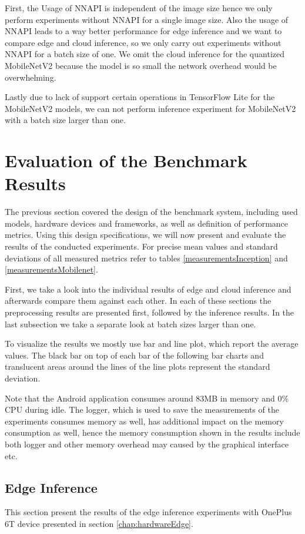 First, the Usage of NNAPI is independent of the image size hence we only perform experiments without NNAPI for a single image size. Also the usage of NNAPI leads to a way better performance for edge inference and we want to compare edge and cloud inference, so we only carry out experiments without NNAPI for a batch size of one.
We omit the cloud inference for the quantized MobileNetV2 because the model is so small the network overhead would be overwhelming.%

Lastly due to lack of support certain operations in TensorFlow Lite for the MobileNetV2 models, we can not perform inference experiment for MobileNetV2 with a batch size larger than one.

\section{Evaluation of the Benchmark Results}
\label{chap:Evaluation}
The previous section covered the design of the benchmark system, including used models, hardware devices and frameworks, as well as definition of performance metrics. Using this design specifications, we will now present and evaluate the results of the conducted experiments.
For precise mean values and standard deviations of all measured metrics refer to tables \ref{measurementsInception} and \ref{measurementsMobilenet}.

First, we take a look into the individual results of edge and cloud inference and afterwards compare them against each other. In each of these sections the preprocessing results are presented first, followed by the inference results.
In the last subsection we take a separate look at batch sizes larger than one.

To visualize the results we mostly use bar and line plot, which report the average values.
The black bar on top of each bar of the following bar charts and translucent areas around the lines of the line plots represent the standard deviation.

Note that the Android application consumes around 83MB in memory and 0\% CPU during idle. The logger, which is used to save the measurements of the experiments consumes memory as well, has additional impact on the memory consumption as well, hence the memory consumption shown in the results include both logger and other memory overhead may caused by the graphical interface etc.


\subsection{Edge Inference}
This section present the results of the edge inference experiments with OnePlus 6T device presented in section \ref{chap:hardwareEdge}.

